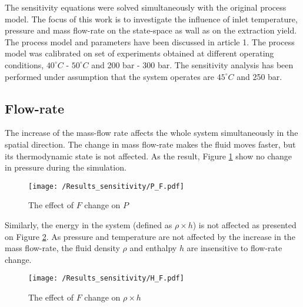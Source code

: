 \documentclass[../Article_Model_Parameters.tex]{subfiles}
\begin{document}
	
	\label{CH: Results}
	
	The sensitivity equations were solved simultaneously with the original process model. The focus of this work is to investigate the influence of inlet temperature, pressure and mass flow-rate on the state-space as wall as on the extraction yield. The process model and parameters have been discussed in {\color{red}article 1}. The process model was calibrated on set of experiments obtained at different operating conditions, $40^\circ C$ - $50^\circ C$ and 200 bar - 300 bar. The sensitivity analysis has been performed under assumption that the system operates are $45^\circ C$ and 250 bar.
	
	\subsection{Flow-rate}
	
	The increase of the mass-flow rate affects the whole system simultaneously in the spatial direction. The change in mass flow-rate makes the fluid moves faster, but its thermodynamic state is not affected. As the result, Figure \ref{fig:Sensitivty_F_P} show no change in pressure during the simulation. 
    
    \begin{figure}[h!]
    	\centering
    	\texttt{[image: /Results\_sensitivity/P\_F.pdf]}
    	\caption{The effect of $F$ change on $P$}
    	\label{fig:Sensitivty_F_P}
    \end{figure}
    
    Similarly, the energy in the system (defined as $\rho \times h$) is not affected as presented on Figure \ref{fig:Sensitivty_F_H}. As pressure and temperature are not affected by the increase in the mass flow-rate, the fluid density $\rho$ and enthalpy $h$ are insensitive to flow-rate change.
    
    \begin{figure}[h!]
    	\centering
    	\texttt{[image: /Results\_sensitivity/H\_F.pdf]}
    	\caption{The effect of $F$ change on $\rho \times h$}
    	\label{fig:Sensitivty_F_H}
    \end{figure}
    
\end{document}
